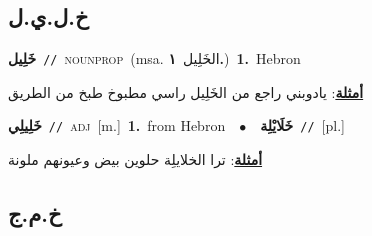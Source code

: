 \documentclass[10pt,a4paper,twoside]{article} %
\begin{document}
\begin{multicols}{2}
\vspace{-3mm}
\subsection*{\color{blue}\foreignlanguage{arabic}{خ.ل.ي.ل}\color{blue}{ (ntws)}} 

{\setlength\topsep{0pt}\textbf{\foreignlanguage{arabic}{خَلِيل}}\ {\color{gray}\texttt{//}\color{black}}\ \textsc{noun\textunderscore prop}\ \color{gray}(msa. \foreignlanguage{arabic}{الخَلِيل}~\foreignlanguage{arabic}{\textbf{١.}})\color{black}\ \textbf{1.}~Hebron\  \begin{flushright}\color{gray}\foreignlanguage{arabic}{\textbf{\underline{\foreignlanguage{arabic}{أمثلة}}}: يادوبني راجع من الخَلِيل راسي مطبوخ طبخ من الطريق}\end{flushright}\color{black}} \vspace{2mm}

{\setlength\topsep{0pt}\textbf{\foreignlanguage{arabic}{خَلِيلِي}}\ {\color{gray}\texttt{//}\color{black}}\ \textsc{adj}\ [m.]\ \textbf{1.}~from Hebron\ \ $\bullet$\ \ \setlength\topsep{0pt}\textbf{\foreignlanguage{arabic}{خَلَايْلِة}}\ {\color{gray}\texttt{//}\color{black}}\ [pl.]\  \begin{flushright}\color{gray}\foreignlanguage{arabic}{\textbf{\underline{\foreignlanguage{arabic}{أمثلة}}}: ترا الخلايلِة حلوين بيض وعيونهم ملونة}\end{flushright}\color{black}} \vspace{2mm}

\vspace{-3mm}
\subsection*{\color{blue}\foreignlanguage{arabic}{خ.م.ج}\color{blue}{}} 


\end{multicols}
\end{document}
